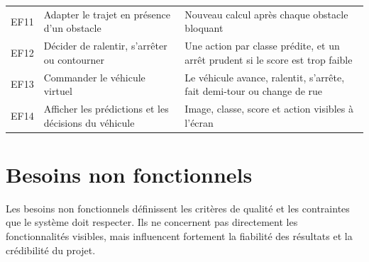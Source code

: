\begin{table}[H]
\begin{tabularx}{\textwidth}{l>{\raggedright\arraybackslash}p{5.4cm}Y}
  EF11 & Adapter le trajet en présence d'un obstacle & Nouveau calcul après chaque obstacle bloquant \\
  EF12 & Décider de ralentir, s'arrêter ou contourner & Une action par classe prédite, et un arrêt prudent si le score est trop faible \\
  EF13 & Commander le véhicule virtuel & Le véhicule avance, ralentit, s'arrête, fait demi-tour ou change de rue \\
  EF14 & Afficher les prédictions et les décisions du véhicule & Image, classe, score et action visibles à l'écran \\
  \bottomrule
\end{tabularx}
\end{table}

\section{Besoins non fonctionnels}

Les besoins non fonctionnels définissent les critères de qualité et les contraintes que le système doit respecter. Ils ne concernent pas directement les fonctionnalités visibles, mais influencent fortement la fiabilité des résultats et la crédibilité du projet.

